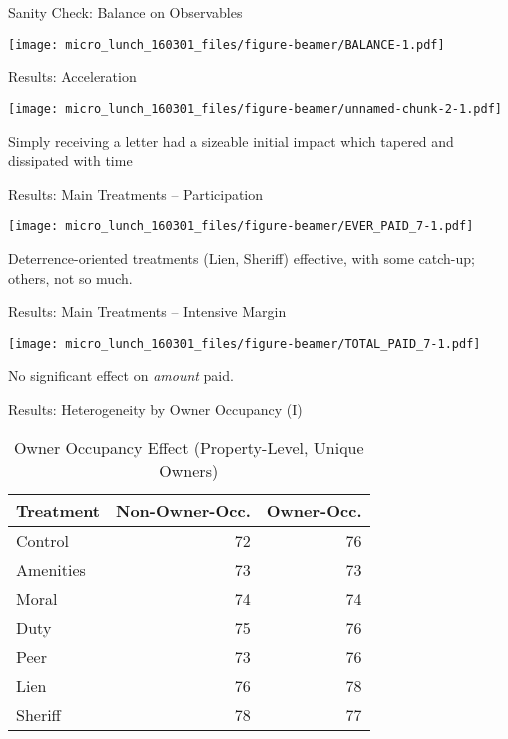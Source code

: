 \documentclass[ignorenonframetext,]{beamer}
\begin{document}
\begin{frame}{Sanity Check: Balance on Observables}

\texttt{[image: micro\_lunch\_160301\_files/figure-beamer/BALANCE-1.pdf]}

\end{frame}

\begin{frame}{Results: Acceleration}

\texttt{[image: micro\_lunch\_160301\_files/figure-beamer/unnamed-chunk-2-1.pdf]}

Simply receiving a letter had a sizeable initial impact which tapered
and dissipated with time

\end{frame}

\begin{frame}{Results: Main Treatments -- Participation}

\texttt{[image: micro\_lunch\_160301\_files/figure-beamer/EVER\_PAID\_7-1.pdf]}

Deterrence-oriented treatments (Lien, Sheriff) effective, with some
catch-up; others, not so much.

\end{frame}

\begin{frame}{Results: Main Treatments -- Intensive Margin}

\texttt{[image: micro\_lunch\_160301\_files/figure-beamer/TOTAL\_PAID\_7-1.pdf]}

No significant effect on \emph{amount} paid.

\end{frame}

\begin{frame}{Results: Heterogeneity by Owner Occupancy (I)}

\begin{table}[ht]
\centering
\begin{tabular}{lrr}
  \hline
Treatment & Non-Owner-Occ. & Owner-Occ. \\ 
  \hline
Control & 72 & 76 \\ 
  Amenities & 73 & 73 \\ 
  Moral & 74 & 74 \\ 
  Duty & 75 & 76 \\ 
  Peer & 73 & 76 \\ 
  Lien & 76 & 78 \\ 
  Sheriff & 78 & 77 \\ 
   \hline
\end{tabular}
\caption{Owner Occupancy Effect (Property-Level, Unique Owners)} 
\label{table:delta_by_owner_occ_unq}
\end{table}

\end{frame}
\end{document}
